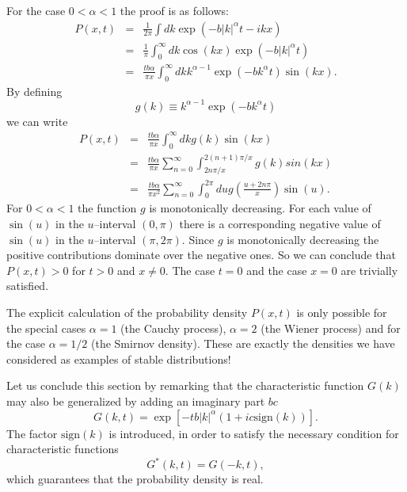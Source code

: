 For the case $0 < \alpha <1$ the proof is as follows:
\begin{eqnarray*}
  P(x,t) & = & \frac{1}{2 \pi}  \int dk \exp(- b |k|^{\alpha}t - ikx) \\
         & = & \frac{1}{\pi} \int_0^{\infty} dk 
                   \cos(kx) \exp(
                   - b |k|^{\alpha} t) \\
         & = & \frac{tb \alpha}{\pi x} \int_0^{\infty} dk
                    k^{\alpha -1} \exp(-b k^{\alpha}t ) \sin(kx). 
\end{eqnarray*}
By defining
\begin{displaymath}
  g(k) \equiv  k^{\alpha -1} \exp(-b k^{\alpha}t )
\end{displaymath}
we can write
\begin{eqnarray*}
  P(x,t) & = & \frac{tb\alpha}{\pi x} \int_0^{\infty} dk
                    g(k)  \sin(kx) \\
         & = & \frac{tb\alpha}{\pi x} \sum_{n=0}^{\infty}
                     \int_{2n\pi / x}^{2(n+1) \pi/x} g(k) sin(kx) \\
         & = &  \frac{tb\alpha}{\pi x^2} \sum_{n=0}^{\infty}
                       \int_0^{2\pi} du g\left(\frac{u+2n\pi}{x} \right)
                         \sin(u). 
\end{eqnarray*}
For $0<\alpha <1$ the function $g$ is monotonically decreasing. For each
value of $\sin(u)$ in the $u$--interval $(0,\pi)$ there is a corresponding 
negative value of $\sin(u)$ in the $u$--interval $(\pi, 2 \pi)$. Since $g$ is
monotonically decreasing the positive contributions dominate over the negative
ones. So we can conclude that $P(x,t) >0$ for $t>0$ and $x \ne 0$. The case
$t=0$ and the case $x=0$ are trivially satisfied.


The explicit calculation of
the probability density $P(x,t)$ is only possible for the special cases
$\alpha =1$ (the Cauchy process), $\alpha = 2$ (the Wiener process) and for
the case $\alpha =1/2$ (the Smirnov density). 
These are exactly the densities we have considered as
examples of stable distributions!

Let us conclude this section by remarking that the characteristic function 
$G(k)$ may also be generalized by adding an imaginary part $bc$
\begin{displaymath}
  G(k,t) = \exp[-t b |k|^{\alpha} (1 + i c \mbox{sign}(k))].
\end{displaymath}
The factor $\mbox{sign}(k)$ is introduced, in order to satisfy the necessary 
condition for characteristic functions
\begin{displaymath}
  G^{\ast}(k,t) = G(-k,t),
\end{displaymath}
which guarantees that the probability density is real.

